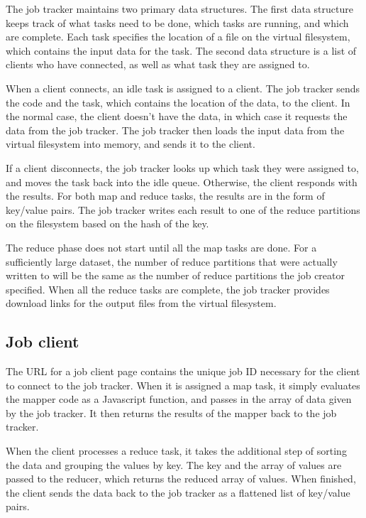 \documentclass{article} %
\begin{document}
The job tracker maintains two primary data structures. The first data structure
keeps track of what tasks need to be done, which tasks are running, and which
are complete. Each task specifies the location of a file on the virtual
filesystem, which contains the input data for the task. The second data
structure is a list of clients who have connected, as well as what task they
are assigned to.

When a client connects, an idle task is assigned to a client. The job tracker
sends the code and the task, which contains the location of the data, to the
client. In the normal case, the client doesn't have the data, in which case it
requests the data from the job tracker. The job tracker then loads the input
data from the virtual filesystem into memory, and sends it to the client.

If a client disconnects, the job tracker looks up which task they were assigned
to, and moves the task back into the idle queue. Otherwise, the client responds
with the results. For both map and reduce tasks, the results are in the form of
key/value pairs. The job tracker writes each result to one of the reduce
partitions on the filesystem based on the hash of the key.

The reduce phase does not start until all the map tasks are done. For a
sufficiently large dataset, the number of reduce partitions that were actually
written to will be the same as the number of reduce partitions the job creator
specified. When all the reduce tasks are complete, the job tracker provides
download links for the output files from the virtual filesystem.

\subsection{Job client}
The URL for a job client page contains the unique job ID necessary for the
client to connect to the job tracker. When it is assigned a map task, it
simply evaluates the mapper code as a Javascript function, and passes in the
array of data given by the job tracker. It then returns the results of the
mapper back to the job tracker.

When the client processes a reduce task, it takes the additional step of sorting
the data and grouping the values by key. The key and the array of values are
passed to the reducer, which returns the reduced array of values. When finished,
the client sends the data back to the job tracker as a flattened list of
key/value pairs.
\end{document}
